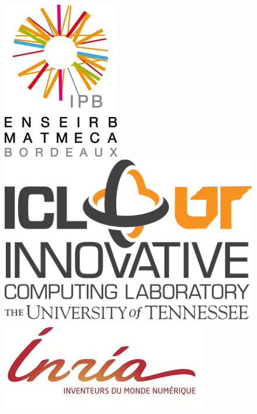 \begin{figure}
\begin{minipage}[b]{0.30\linewidth}
\centering \includegraphics[scale=0.4]{figures/enseirb_logo.jpeg}
\end{minipage}\hfill
\begin{minipage}[b]{0.30\linewidth}
\centering \includegraphics[scale=0.2]{figures/icl_logo.pdf}
\end{minipage}\hfill
\begin{minipage}[b]{0.30\linewidth}
\centering \includegraphics[scale=0.4]{figures/inria_logo.jpeg}
\end{minipage}
\end{figure}

